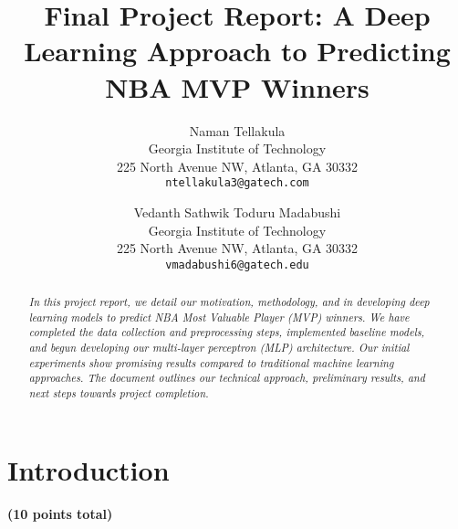 \documentclass[10pt,twocolumn,letterpaper]{article}
\begin{document}
\title{Final Project Report: A Deep Learning Approach to Predicting NBA MVP Winners} %

\author{Naman Tellakula\\
Georgia Institute of Technology\\
225 North Avenue NW, Atlanta, GA 30332\\
{\tt\small ntellakula3@gatech.com} %
\and
Vedanth Sathwik Toduru Madabushi\\ %
Georgia Institute of Technology\\
225 North Avenue NW, Atlanta, GA 30332\\
{\tt\small vmadabushi6@gatech.edu} %
}

\maketitle

\begin{abstract}
   \textit{In this project report, we detail our motivation, methodology, and  in developing deep learning models to predict NBA Most Valuable Player (MVP) winners. We have completed the data collection and preprocessing steps, implemented baseline models, and begun developing our multi-layer perceptron (MLP) architecture. Our initial experiments show promising results compared to traditional machine learning approaches. The document outlines our technical approach, preliminary results, and next steps towards project completion.}

\end{abstract}


\section{Introduction}
\textbf{(10 points total)}
\end{document}
